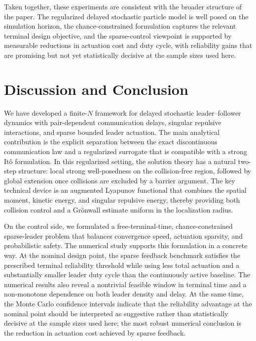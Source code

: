 \documentclass[pdflatex,sn-mathphys-num]{sn-jnl}%
\numberwithin{equation}{section}
\theoremstyle{thmstyleone}%
\theoremstyle{remark}
\theoremstyle{definition}
\begin{document}
Taken together, these experiments are consistent with the broader structure
of the paper. The regularized delayed stochastic particle model is well
posed on the simulation horizon, the chance-constrained formulation captures
the relevant terminal design objective, and the sparse-control viewpoint is
supported by measurable reductions in actuation cost and duty cycle, with
reliability gains that are promising but not yet statistically decisive at
the sample sizes used here.
\section{Discussion and Conclusion}
\label{sec:discussion}

We have developed a finite-$N$ framework for delayed stochastic
leader--follower dynamics with pair-dependent communication delays,
singular repulsive interactions, and sparse bounded leader actuation.
The main analytical contribution is the explicit separation between the
exact discontinuous communication law and a regularized surrogate that is
compatible with a strong It\^o formulation. In this regularized setting,
the solution theory has a natural two-step structure: local strong
well-posedness on the collision-free region, followed by global extension
once collisions are excluded by a barrier argument. The key technical
device is an augmented Lyapunov functional that combines the
spatial moment, kinetic energy, and singular repulsive energy, thereby
providing both collision control and a Gr\"onwall estimate uniform in the
localization radius.

On the control side, we formulated a free-terminal-time,
chance-constrained sparse-leader problem that balances convergence speed,
actuation sparsity, and probabilistic safety. The numerical study supports
this formulation in a concrete way. At the nominal design point, the
sparse feedback benchmark satisfies the prescribed terminal reliability
threshold while using less total actuation and a substantially smaller
leader duty cycle than the continuously active baseline. The numerical
results also reveal a nontrivial feasible window in terminal time and a
non-monotone dependence on both leader density and delay. At the same
time, the Monte Carlo confidence intervals indicate that the reliability
advantage at the nominal point should be interpreted as suggestive rather
than statistically decisive at the sample sizes used here; the most robust
numerical conclusion is the reduction in actuation cost achieved by sparse
feedback.
\end{document}
